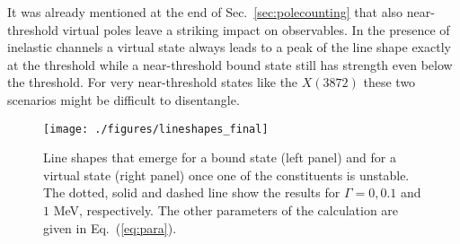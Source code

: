It was already mentioned at the end of Sec.~\ref{sec:polecounting} that also
near-threshold virtual poles leave a striking impact on observables. In the
presence of inelastic channels a virtual state always leads to a peak of the
line shape exactly at the threshold while a near-threshold bound state still has
strength even below the threshold. For very near-threshold states like the
$X(3872)$ these two scenarios might be difficult to disentangle.



\begin{figure} %
 \centering
   \texttt{[image: ./figures/lineshapes\_final]}
   \caption{Line shapes that emerge for a bound state (left panel)
   and for a virtual state (right panel) once one of the constituents is 
   unstable.
   The dotted, solid and dashed line show the results for $\Gamma=0, 0.1$ and 
   $1$ MeV, respectively.
   The other parameters of the calculation are given in
Eq.~(\ref{eq:para}).}\label{fig:lineshapes2}
\end{figure}

